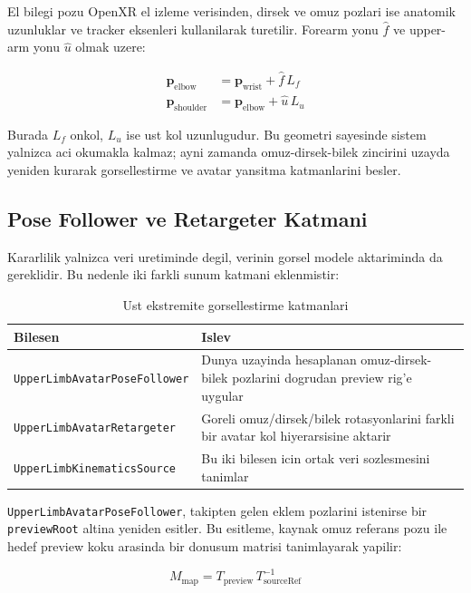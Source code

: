 \documentclass[11pt,a4paper]{article}
\begin{document}
El bilegi pozu OpenXR el izleme verisinden, dirsek ve omuz pozlari ise
anatomik uzunluklar ve tracker eksenleri kullanilarak turetilir. Forearm
yonu $\hat{f}$ ve upper-arm yonu $\hat{u}$ olmak uzere:

\begin{align}
    \mathbf{p}_{\text{elbow}} &= \mathbf{p}_{\text{wrist}} + \hat{f}\,L_f
    \label{eq:elbow_pos} \\
    \mathbf{p}_{\text{shoulder}} &= \mathbf{p}_{\text{elbow}} + \hat{u}\,L_u
    \label{eq:shoulder_pos}
\end{align}

Burada $L_f$ onkol, $L_u$ ise ust kol uzunlugudur. Bu geometri sayesinde
sistem yalnizca aci okumakla kalmaz; ayni zamanda omuz-dirsek-bilek zincirini
uzayda yeniden kurarak gorsellestirme ve avatar yansitma katmanlarini besler.

\subsection{Pose Follower ve Retargeter Katmani}

Kararlilik yalnizca veri uretiminde degil, verinin gorsel modele aktariminda da
gereklidir. Bu nedenle iki farkli sunum katmani eklenmistir:

\begin{table}[H]
\centering
\caption{Ust ekstremite gorsellestirme katmanlari}
\label{tab:ustextremite_katman}
\renewcommand{\arraystretch}{1.22}
\begin{tabularx}{\textwidth}{lX}
\toprule
\textbf{Bilesen} & \textbf{Islev} \\
\midrule
\texttt{UpperLimbAvatarPoseFollower} & Dunya uzayinda hesaplanan omuz-dirsek-bilek pozlarini dogrudan preview rig'e uygular \\
\texttt{UpperLimbAvatarRetargeter} & Goreli omuz/dirsek/bilek rotasyonlarini farkli bir avatar kol hiyerarsisine aktarir \\
\texttt{UpperLimbKinematicsSource} & Bu iki bilesen icin ortak veri sozlesmesini tanimlar \\
\bottomrule
\end{tabularx}
\end{table}

\texttt{UpperLimbAvatarPoseFollower}, takipten gelen eklem pozlarini
istenirse bir \texttt{previewRoot} altina yeniden esitler. Bu esitleme,
kaynak omuz referans pozu ile hedef preview koku arasinda bir donusum
matrisi tanimlayarak yapilir:

\begin{equation}
    M_{\text{map}} = T_{\text{preview}}\,T_{\text{sourceRef}}^{-1}
    \label{eq:preview_map}
\end{equation}
\end{document}
